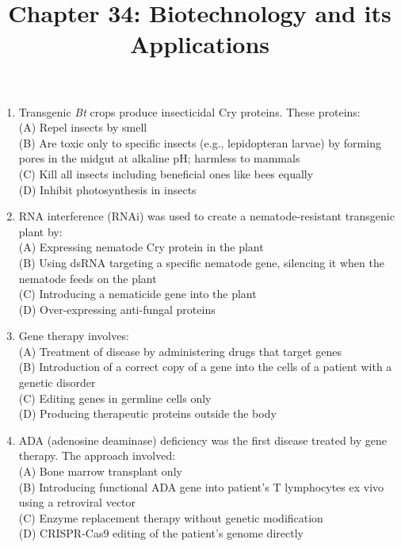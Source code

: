\documentclass{article}
\begin{document}
\title{Chapter 34: Biotechnology and its Applications}
\date{}
\maketitle

\begin{enumerate}[label=Q\arabic*.]

\item Transgenic \textit{Bt} crops produce insecticidal Cry proteins. These proteins:
\\(A) Repel insects by smell
\\(B) Are toxic only to specific insects (e.g., lepidopteran larvae) by forming pores in the midgut at alkaline pH; harmless to mammals
\\(C) Kill all insects including beneficial ones like bees equally
\\(D) Inhibit photosynthesis in insects

\item RNA interference (RNAi) was used to create a nematode-resistant transgenic plant by:
\\(A) Expressing nematode Cry protein in the plant
\\(B) Using dsRNA targeting a specific nematode gene, silencing it when the nematode feeds on the plant
\\(C) Introducing a nematicide gene into the plant
\\(D) Over-expressing anti-fungal proteins

\item Gene therapy involves:
\\(A) Treatment of disease by administering drugs that target genes
\\(B) Introduction of a correct copy of a gene into the cells of a patient with a genetic disorder
\\(C) Editing genes in germline cells only
\\(D) Producing therapeutic proteins outside the body

\item ADA (adenosine deaminase) deficiency was the first disease treated by gene therapy. The approach involved:
\\(A) Bone marrow transplant only
\\(B) Introducing functional ADA gene into patient's T lymphocytes ex vivo using a retroviral vector
\\(C) Enzyme replacement therapy without genetic modification
\\(D) CRISPR-Cas9 editing of the patient's genome directly


\end{enumerate}
\end{document}
